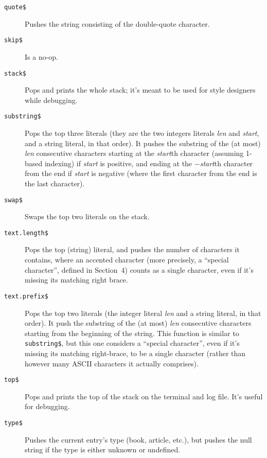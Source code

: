 \begin{description}
\item[\hbox{\tt quote\$}\hfill]
Pushes the string consisting of the double-quote character.

\item[\hbox{\tt skip\$}\hfill]
Is a no-op.

\item[\hbox{\tt stack\$}\hfill]
Pops and prints the whole stack;
it's meant to be used for style designers while debugging.

\item[\hbox{\tt substring\$}\hfill]
Pops the top three literals
(they are the two integers literals {\it len\/} and {\it start}, and a
string literal, in that order).
It pushes the substring of the (at most) {\it len\/} consecutive characters
starting at the {\it start\/}th character (assuming 1-based indexing)
if {\it start\/} is positive, and ending at the $-${\it start\/}th character
from the end if {\it start\/} is negative
(where the first character from the end is the last character).

\item[\hbox{\tt swap\$}\hfill]
Swaps the top two literals on the stack.

\item[\hbox{\tt text.length\$}\hfill]
Pops the top (string) literal,
and pushes the number of characters it contains, where an
accented character (more precisely, a ``special character''$\!$,
defined in Section~4)
counts as a single character, even if it's missing
its matching right brace.

\item[\hbox{\tt text.prefix\$}\hfill]
Pops the top two literals
(the integer literal {\it len\/} and a string literal, in that order).
It push the substring of the (at most) {\it len\/} consecutive
characters starting from the beginning of the string.  This function
is similar to \hbox{\tt substring\$}, but this one considers
a ``special character''$\!$, even if
it's missing its matching right-brace, to be a single character
(rather than however many ASCII characters it actually comprises).

\item[\hbox{\tt top\$}\hfill]
Pops and prints the top of the stack on the terminal and log file.
It's useful for debugging.

\item[\hbox{\tt type\$}\hfill]
Pushes the current entry's type (book, article, etc.),
but pushes the null string
if the type is either unknown or undefined.


\end{description}
